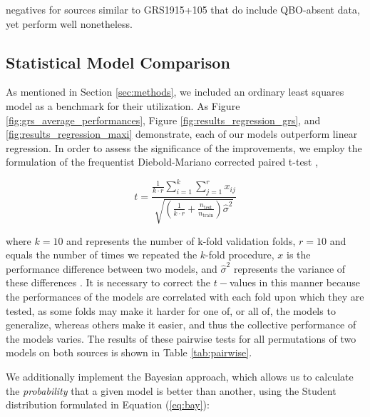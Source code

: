 \documentclass[fleqn,usenatbib,twocolumn]{mnras}%
\begin{document}
negatives for sources similar to GRS1915+105 that do include QBO-absent data, yet perform well nonetheless.

\subsection{Statistical Model Comparison} \label{sec:model_comparison}

As mentioned in Section \ref{sec:methods}, we included an ordinary least squares model as a benchmark for their utilization. As Figure \ref{fig:grs_average_performances}, Figure \ref{fig:results_regression_grs}, and \ref{fig:results_regression_maxi} demonstrate, each of our models outperform linear regression. In order to assess the significance of the improvements, we employ the \cite{nadeauandbengio} formulation of the frequentist Diebold-Mariano corrected paired t-test \citep{dieboldandmariano}, 



\begin{equation}\label{eq:freq}
    t=\frac{\frac{1}{k \cdot r}\sum_{i=1}^{k}\sum_{j=1}^{r}x_{ij}}
{\sqrt{(\frac{1}{k \cdot r}+\frac{n_{\mathrm{test}}}{n_{\mathrm{train}}})\hat{\sigma}^2}}
\end{equation}

\noindent where $k=10$ and represents the number of k-fold validation folds, $r=10$ and equals the number of times we repeated the $k$-fold procedure, $x$ is the performance difference between two models, and $\hat{\sigma}^2$
represents the variance of these differences \citep{scikit-learn}. It is necessary to correct the $t-$values in this manner because the performances of the models are correlated with each fold upon which they are tested, as some folds may make it harder for one of, or all of, the models to generalize, whereas others make it easier, and thus the collective performance of the models varies. The results of these pairwise tests for all permutations of two models on both sources is shown in Table \ref{tab:pairwise}. 

We additionally implement the Bayesian \cite{benavoli} approach, which allows us to calculate the \textit{probability} that a given model is better than another, using the Student distribution formulated in Equation (\ref{eq:bay}): 
\end{document}
